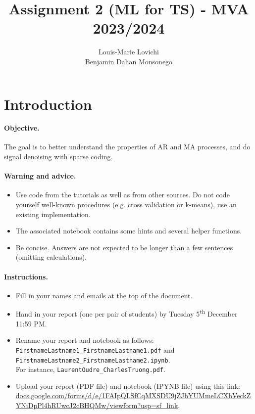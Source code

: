 \documentclass[11pt]{article}
\title{Assignment 2 (ML for TS) - MVA 2023/2024}
\author{
Louis-Marie Lovichi \email{lm.lovichi@me.com} \\ %
Benjamin Dahan Monsonego \email{benjamin.dahan\_monsonego@ens-paris-saclay.fr} %
}
\begin{document}
\maketitle

\section{Introduction}

\paragraph{Objective.} The goal is to better understand the properties of AR and MA processes, and do signal denoising with sparse coding.

\paragraph{Warning and advice.} 
\begin{itemize}
    \item Use code from the tutorials as well as from other sources. Do not code yourself well-known procedures (e.g. cross validation or k-means), use an existing implementation. 
    \item The associated notebook contains some hints and several helper functions.
    \item Be concise. Answers are not expected to be longer than a few sentences (omitting calculations).
\end{itemize}



\paragraph{Instructions.}
\begin{itemize}
    \item Fill in your names and emails at the top of the document.
    \item Hand in your report (one per pair of students) by Tuesday 5\textsuperscript{th} December 11:59 PM.
    \item Rename your report and notebook as follows:\\ \texttt{FirstnameLastname1\_FirstnameLastname1.pdf} and\\ \texttt{FirstnameLastname2\_FirstnameLastname2.ipynb}.\\
    For instance, \texttt{LaurentOudre\_CharlesTruong.pdf}.
    \item Upload your report (PDF file) and notebook (IPYNB file) using this link: \href{https://docs.google.com/forms/d/e/1FAIpQLSfCqMXSDU9jZJbYUMmeLCXbVeckZYNiDpPl4hRUwcJ2cBHQMw/viewform?usp=sf_link}{docs.google.com/forms/d/e/1FAIpQLSfCqMXSDU9jZJbYUMmeLCXbVeckZYNiDpPl4hRUwcJ2cBHQMw/viewform?usp=sf\_link}.
\end{itemize}
\end{document}
